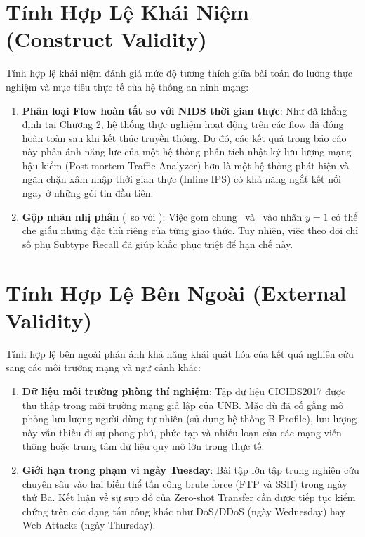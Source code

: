 \section{Tính Hợp Lệ Khái Niệm (Construct Validity)}

Tính hợp lệ khái niệm đánh giá mức độ tương thích giữa bài toán đo lường thực nghiệm và mục tiêu thực tế của hệ thống an ninh mạng:
\begin{enumerate}
    \item \textbf{Phân loại Flow hoàn tất so với NIDS thời gian thực}: Như đã khẳng định tại Chương 2, hệ thống thực nghiệm hoạt động trên các flow đã đóng hoàn toàn sau khi kết thúc truyền thông. Do đó, các kết quả trong báo cáo này phản ánh năng lực của một hệ thống phân tích nhật ký lưu lượng mạng hậu kiểm (Post-mortem Traffic Analyzer) hơn là một hệ thống phát hiện và ngăn chặn xâm nhập thời gian thực (Inline IPS) có khả năng ngắt kết nối ngay ở những gói tin đầu tiên.
    \item \textbf{Gộp nhãn nhị phân} (\Normal\ so với \Attack): Việc gom chung \FTP\ và \SSH\ vào nhãn $y=1$ có thể che giấu những đặc thù riêng của từng giao thức. Tuy nhiên, việc theo dõi chỉ số phụ Subtype Recall đã giúp khắc phục triệt để hạn chế này.
\end{enumerate}

\section{Tính Hợp Lệ Bên Ngoài (External Validity)}

Tính hợp lệ bên ngoài phản ánh khả năng khái quát hóa của kết quả nghiên cứu sang các môi trường mạng và ngữ cảnh khác:
\begin{enumerate}
    \item \textbf{Dữ liệu môi trường phòng thí nghiệm}: Tập dữ liệu CICIDS2017 được thu thập trong môi trường mạng giả lập của UNB. Mặc dù đã cố gắng mô phỏng lưu lượng người dùng tự nhiên (sử dụng hệ thống B-Profile), lưu lượng này vẫn thiếu đi sự phong phú, phức tạp và nhiễu loạn của các mạng viễn thông hoặc trung tâm dữ liệu quy mô lớn trong thực tế.
    \item \textbf{Giới hạn trong phạm vi ngày Tuesday}: Bài tập lớn tập trung nghiên cứu chuyên sâu vào hai biến thể tấn công brute force (FTP và SSH) trong ngày thứ Ba. Kết luận về sự sụp đổ của Zero-shot Transfer cần được tiếp tục kiểm chứng trên các dạng tấn công khác như DoS/DDoS (ngày Wednesday) hay Web Attacks (ngày Thursday).
\end{enumerate}

